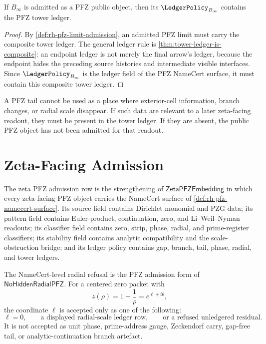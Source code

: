 \begin{theorem}
\label{thm:rh-pfz-limit-admission-requires-tower-ledger}
If $B_{\infty}$ is admitted as a PFZ public object, then its
$\LedgerPolicy_{B_{\infty}}$ contains the PFZ tower ledger.
\end{theorem}

\begin{proof}
By \autoref{def:rh-pfz-limit-admission}, an admitted PFZ limit must carry
the composite tower ledger.  The general ledger rule is
\autoref{thm:tower-ledger-is-composite}: an endpoint ledger is not merely
the final arrow's ledger, because the endpoint hides the preceding
source histories and intermediate visible interfaces.  Since
$\LedgerPolicy_{B_{\infty}}$ is the ledger field of the PFZ NameCert
surface, it must contain this composite tower ledger.
\end{proof}

\begin{principle}
\label{prin:rh-no-gap-free-pfz-tail}
A PFZ tail cannot be used as a place where exterior-cell information,
branch changes, or radial scale disappear.  If such data are relevant to
a later zeta-facing readout, they must be present in the tower ledger.
If they are absent, the public PFZ object has not been admitted for that
readout.
\end{principle}

\section{Zeta-Facing Admission}
\label{sec:rh-pfz-zeta-facing-admission}

\begin{definition}
\label{def:rh-zeta-pfz-namecert-admission}
The zeta PFZ admission row is the strengthening of
$\mathsf{ZetaPFZEmbedding}$ in which every zeta-facing PFZ object carries
the NameCert surface of \autoref{def:rh-pfz-namecert-surface}.  Its
source field contains Dirichlet monomial and PZG data; its pattern field
contains Euler-product, continuation, zero, and Li--Weil--Nyman readouts;
its classifier field contains zero, strip, phase, radial, and
prime-register classifiers; its stability field contains analytic
compatibility and the scale-obstruction bridge; and its ledger policy
contains gap, branch, tail, phase, radial, and tower ledgers.
\end{definition}

\begin{definition}
\label{def:rh-namecert-level-radial-refusal}
The NameCert-level radial refusal is the PFZ admission form of
$\mathsf{NoHiddenRadialPFZ}$.  For a centered zero packet with
$$
z(\rho)=1-\frac1\rho=e^{\ell+i\theta},
$$
the coordinate $\ell$ is accepted only as one of the following:
$$
\ell=0,
\qquad
\text{a displayed radial-scale ledger row},
\qquad
\text{or a refused unledgered residual}.
$$
It is not accepted as unit phase, prime-address gauge, Zeckendorf carry,
gap-free tail, or analytic-continuation branch artefact.
\end{definition}

